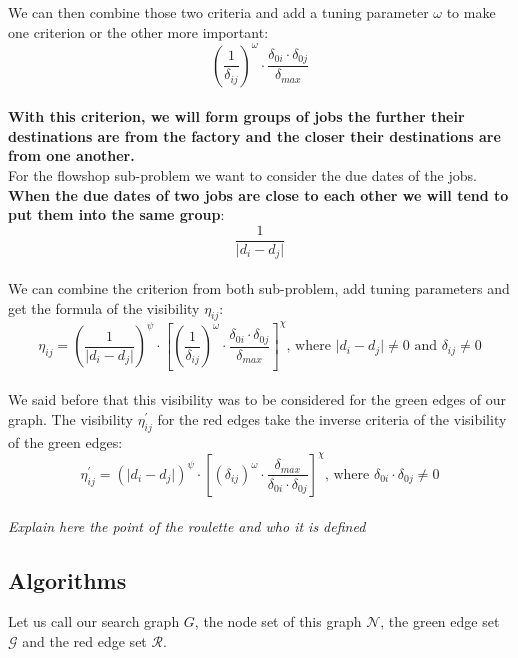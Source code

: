 \documentclass[UTF8, twoside]{EPURapport}
\begin{document}
	We can then combine those two criteria and add a tuning parameter $\omega$ to make one criterion or the other more important: 
\\

\[
\left(\frac{1}{\delta_{ij}}\right)^\omega \cdot \frac{\delta_{0i} \cdot \delta_{0j}}{\delta_{max}}
\]
\\

\textbf{With this criterion, we will form groups of jobs the further their destinations are from the factory and the closer their destinations are from one another.}
\\

	For the flowshop sub-problem we want to consider the due dates of the jobs. \textbf{When the due dates of two jobs are close to each other we will tend to put them into the same group}: 
\\

\[
\frac{1}{\vert d_i - d_j \vert}
\]
\\

	We can combine the criterion from both sub-problem, add tuning parameters and get the formula of the visibility $\eta_{ij}$:
\\

\[
\eta_{ij} = 
\left( \frac{1}{\vert d_i - d_j \vert} \right)^\psi \cdot \left[\left(\frac{1}{\delta_{ij}}\right)^\omega \cdot \frac{\delta_{0i} \cdot \delta_{0j}}{\delta_{max}} \right]^\chi \text{, where } \vert d_i - d_j \vert \neq 0 \text{ and } \delta_{ij} \neq 0
\]
\\

	We said before that this visibility was to be considered for the green edges of our graph. The visibility $\eta_{ij}^{'}$ for the red edges take the inverse criteria of the visibility of the green edges:
\\

\[
\eta_{ij}^{'} = 
\left( \vert d_i - d_j \vert \right)^\psi \cdot \left[\left(\delta_{ij}\right)^\omega \cdot \frac{\delta_{max}}{\delta_{0i} \cdot \delta_{0j}} \right]^\chi \text{, where } \delta_{0i} \cdot \delta_{0j} \neq 0 
\]
\\
	
\textit{Explain here the point of the roulette and who it is defined}

\subsection{Algorithms}

	Let us call our search graph $G$, the node set of this graph $\mathscr{N}$, the green edge set $\mathscr{G}$ and the red edge set $\mathscr{R}$. 
\end{document}
